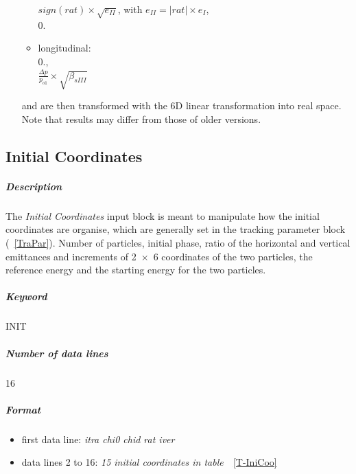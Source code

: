 \documentclass[a4paper,11pt]{report}
\begin{document}
\begin{enumerate}
\begin{itemize}
 $sign(rat)\times \sqrt{e_{II}}$, with $e_{II} =
 \left|rat\right|\times e_{I}$,\\

 $0.$

\item longitudinal: \\

$0.$,\\ 

$\frac{\Delta p}{p_{o1}} \times \sqrt{\beta_{sIII}}$

\end{itemize}
and are then transformed with the 6D linear transformation into real
space. Note that results may differ from those of older versions.
\end{enumerate}

\subsection{Initial Coordinates} \label{IniCoo}

\subparagraph{Description} The {\em Initial Coordinates} \/input block
is meant to manipulate how the initial coordinates are organise, which
are generally set in the tracking parameter block (~\ref{TraPar}).
Number of particles, initial phase, ratio of the horizontal and
vertical emittances and increments of \mbox{2 $\times$ 6} coordinates
of the two particles, the reference energy and the starting energy for
the two particles.

\subparagraph{Keyword} INIT \subparagraph{Number of data lines} 16

\subparagraph{Format}
\begin{itemize}
\item first data line: {\em itra chi0 chid rat iver}
\item data lines 2 to 16: {\em 15 initial coordinates in
    table~}~\ref{T-IniCoo}
\end{itemize}
\end{document}
